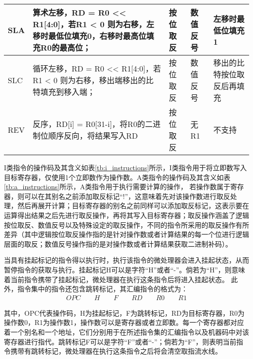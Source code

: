 \begin{table}
\begin{tabular}{C{1.3cm}|L{7.5cm}|C{1cm}|C{1cm}|C{2cm}}
        \hline
        SLA & 算术左移，RD = R0 << R1[4:0]，若R1 < 0 则为右移，左移时最低位填充0，右移时最高位填充R0的最高位； & 按位取反 & 数值反号 & 左移时最低位填充1 \\
        \hline
        SLC & 循环左移，RD = R0 << R1[4:0]，若R1 < 0 则为右移，移出端移出的比特填充到移入端；& 按位取反 & 数值反号 & 移出的比特按位取反后再填充 \\
        \hline
        REV & 反序，RD[i] = R0[31-i]，将R0的二进制位顺序反向，将结果写入RD & 按位取反 & 无R1 & 不支持 \\
        \bottomrule
    \end{tabular}
\end{table}

I类指令的操作码及其含义如表\ref{tb:i_instructions}所示，I类指令用于将立即数写入目标寄存器，仅使用1个立即数作为操作数。A类指令的操作码及其含义如表\ref{tb:a_instructions}所示，A类指令用于执行需要计算的操作，
若操作数属于寄存器，则可以在其别名之前添加取反标记“!”，这意味着先对该操作数进行取反处理，然后再展开计算；目标寄存器的别名之前同样可以添加取反标记，这表示要在运算得出结果之后先进行取反操作，再将其写入目标寄存器；取反操作涵盖了逻辑按位取反、数值反号以及特殊设定的取反操作，不同的指令所采用的取反操作有所差异（其中逻辑按位取反操作指的是针对操作数或者计算结果的每一个位进行逻辑层面的取反；数值反号操作指的是对操作数或者计算结果获取二进制补码）。

当具有挂起标记的指令得以执行时，执行该指令的微处理器会进入挂起状态，从而暂停指令的获取与执行。挂起标记H可以是字符“H”或者“-”。倘若为“H”，则意味着当前指令携带了挂起标记，微处理器在执行这条指令后将进入挂起状态。
此外，指令集中的指令还包含跳转标记，其汇编指令的格式为：
\begin{align}
    OPC \qquad H \qquad F \qquad RD \qquad R0 \qquad R1
\end{align}

其中，OPC代表操作码，H为挂起标记，F为跳转标记，RD为目标寄存器，R0为操作数0，R1为操作数1，操作数可以是寄存器或者立即数。每一个寄存器都对应着一个别名和一个地址，它们分别用于在所述指令集的汇编指令以及机器码中对该寄存器进行指代。跳转标记F可以是字符“F”或者“-”；倘若为“F”，则表明当前指令携带有跳转标记，微处理器在执行这条指令之后将会清空取指流水线。


